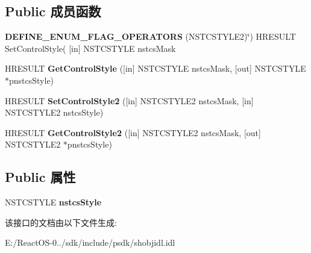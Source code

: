 \subsection*{Public 成员函数}
\begin{DoxyCompactItemize}
\item 
\mbox{\label{interface_i_name_space_tree_control2_ae0e1dff655227bacc46a2bad93f6c064}} 
{\bfseries D\+E\+F\+I\+N\+E\+\_\+\+E\+N\+U\+M\+\_\+\+F\+L\+A\+G\+\_\+\+O\+P\+E\+R\+A\+T\+O\+RS} (N\+S\+T\+C\+S\+T\+Y\+L\+E2)\char`\"{}) H\+R\+E\+S\+U\+LT Set\+Control\+Style( \mbox{[}in\mbox{]} N\+S\+T\+C\+S\+T\+Y\+LE nstcs\+Mask
\item 
\mbox{\label{interface_i_name_space_tree_control2_a7fe9aae8209235a6fdd25565f0645eb3}} 
H\+R\+E\+S\+U\+LT {\bfseries Get\+Control\+Style} (\mbox{[}in\mbox{]} N\+S\+T\+C\+S\+T\+Y\+LE nstcs\+Mask, \mbox{[}out\mbox{]} N\+S\+T\+C\+S\+T\+Y\+LE $\ast$pnstcs\+Style)
\item 
\mbox{\label{interface_i_name_space_tree_control2_ad6cd4d8cc35b9c93c1cf74de10167634}} 
H\+R\+E\+S\+U\+LT {\bfseries Set\+Control\+Style2} (\mbox{[}in\mbox{]} N\+S\+T\+C\+S\+T\+Y\+L\+E2 nstcs\+Mask, \mbox{[}in\mbox{]} N\+S\+T\+C\+S\+T\+Y\+L\+E2 nstcs\+Style)
\item 
\mbox{\label{interface_i_name_space_tree_control2_ae0697d3efd52a7919f19dd5bcabbcf4c}} 
H\+R\+E\+S\+U\+LT {\bfseries Get\+Control\+Style2} (\mbox{[}in\mbox{]} N\+S\+T\+C\+S\+T\+Y\+L\+E2 nstcs\+Mask, \mbox{[}out\mbox{]} N\+S\+T\+C\+S\+T\+Y\+L\+E2 $\ast$pnstcs\+Style)
\end{DoxyCompactItemize}
\subsection*{Public 属性}
\begin{DoxyCompactItemize}
\item 
\mbox{\label{interface_i_name_space_tree_control2_adbf9f077aebe96015a61e64cab591f42}} 
N\+S\+T\+C\+S\+T\+Y\+LE {\bfseries nstcs\+Style}
\end{DoxyCompactItemize}


该接口的文档由以下文件生成\+:\begin{DoxyCompactItemize}
\item 
E\+:/\+React\+O\+S-\/0../sdk/include/psdk/shobjidl.\+idl\end{DoxyCompactItemize}
